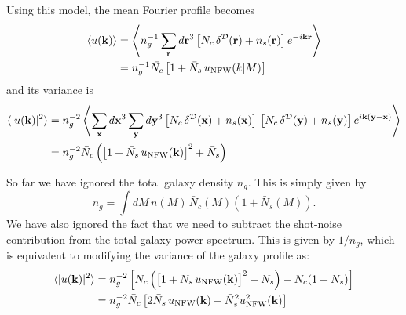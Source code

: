 \documentclass{article}
\begin{document}
Using this model, the mean Fourier profile becomes
\begin{align}
 \langle u({\bf k})\rangle
 &=\left\langle n_g^{-1}\sum_{\bf r} d{\bf r}^3 \left[N_c\,\delta^{\cal D}({\bf r})+n_s({\bf r})\right]e^{-i{\bf k}{\bf r}}\right\rangle\\
 &=n_g^{-1}\bar{N_c}\left[1+\bar{N}_s\,u_{\rm NFW}(k|M)\right]\\
\end{align}
and its variance is
\begin{align}
  \langle |u({\bf k})|^2\rangle
  &=n_g^{-2}\left\langle \sum_{\bf x} d{\bf x}^3\sum_{\bf y} d{\bf y}^3 \left[N_c\,\delta^{\cal D}({\bf x})+n_s({\bf x})\right]\,\left[N_c\,\delta^{\cal D}({\bf y})+n_s({\bf y})\right]e^{i{\bf k}({\bf y}-{\bf x})}\right\rangle\\ 
  &=n_g^{-2}\bar{N}_c\left(\left[1+\bar{N}_s\,u_{\rm NFW}({\bf k})\right]^2+\bar{N}_s\right)
\end{align}

So far we have ignored the total galaxy density $n_g$. This is simply given by 
\begin{equation}
  n_g=\int dM\,n(M)\,\bar{N}_c(M)\left(1+\bar{N}_s(M)\right).
\end{equation}
We have also ignored the fact that we need to subtract the shot-noise contribution from the total galaxy power spectrum. This is given by $1/n_g$, which is equivalent to modifying the variance of the galaxy profile as:
\begin{align}
  \langle |u({\bf k})|^2\rangle
  &=n_g^{-2}\left[\bar{N}_c\left(\left[1+\bar{N}_s\,u_{\rm NFW}({\bf k})\right]^2+\bar{N}_s\right)-\bar{N}_c(1+\bar{N}_s)\right]\\
  &=n_g^{-2}\bar{N}_c\left[2\bar{N}_s\,u_{\rm NFW}({\bf k})+\bar{N}_s^2u_{\rm NFW}^2({\bf k})\right]
\end{align}






\end{document}
